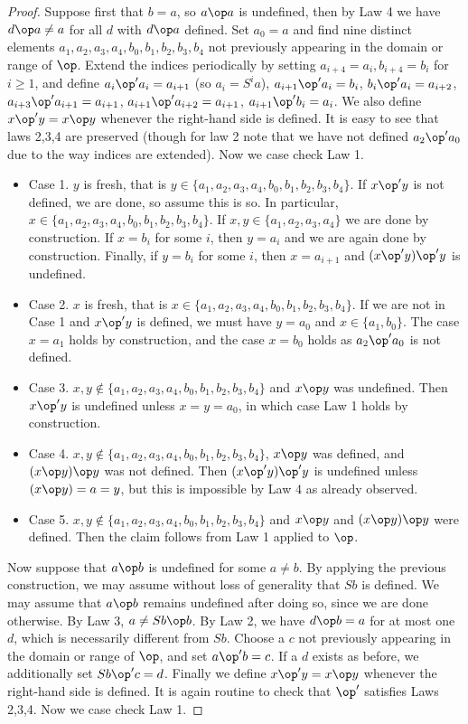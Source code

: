 \begin{proof}  Suppose first that $b=a$, so $a \op a$ is undefined, then by Law 4 we have $d \op a \neq a$ for all $d$ with $d \op a$ defined. Set $a_0=a$ and find nine distinct elements $a_1,a_2,a_3,a_4,b_0,b_1,b_2,b_3,b_4$ not previously appearing in the domain or range of $\op$. Extend the indices periodically by setting $a_{i+4} = a_i,b_{i+4} = b_i$ for $i \ge 1$, and define $a_i \op' a_i = a_{i+1}$ (so $a_i = S^i a$), $a_{i+1} \op' a_i = b_i$, $b_i \op' a_i = a_{i+2}$, $a_{i+3} \op' a_{i+1} = a_{i+1}$, $a_{i+1} \op' a_{i+2} = a_{i+1}$, $a_{i+1} \op' b_i = a_i$.  We also define $x \op' y = x \op y$ whenever the right-hand side is defined. It is easy to see that laws 2,3,4 are preserved (though for law 2 note that we have not defined $a_2 \op' a_0$ due to the way indices are extended). Now we case check Law 1.  \begin{itemize}
    \item Case 1. $y$ is fresh, that is $y \in \{a_1,a_2,a_3,a_4,b_0,b_1,b_2,b_3,b_4\}$. If $x \op' y$ is not defined, we are done, so assume this is so. In particular, $x  \in \{a_1,a_2,a_3,a_4,b_0,b_1,b_2,b_3,b_4\}$. If $x,y \in \{a_1,a_2,a_3,a_4\}$ we are done by construction. If $x = b_i$ for some $i$, then $y = a_i$ and we are again done by construction. Finally, if $y = b_i$ for some $i$, then $x = a_{i+1}$ and $(x \op' y) \op' y$ is undefined.
    \item Case 2. $x$ is fresh, that is $x \in \{a_1,a_2,a_3,a_4,b_0,b_1,b_2,b_3,b_4\}$. If we are not in Case 1 and $x \op' y$ is defined, we must have $y = a_0$ and $x \in \{a_1, b_0\}$. The case $x = a_1$ holds by construction, and the case $x = b_0$ holds as $a_2 \op' a_0$ is not defined.
    \item Case 3. $x,y \not \in  \{a_1,a_2,a_3,a_4,b_0,b_1,b_2,b_3,b_4\}$ and $x \op y$ was undefined. Then $x \op' y$ is undefined unless $x=y=a_0$, in which case Law 1 holds by construction.
    \item Case 4. $x,y \not \in  \{a_1,a_2,a_3,a_4,b_0,b_1,b_2,b_3,b_4\}$, $x \op y$ was defined, and $(x \op y) \op y$ was not defined. Then $(x \op' y) \op' y$ is undefined unless $(x \op y) = a = y$, but this is impossible by Law $4$ as already observed.
    \item Case 5. $x,y \not \in  \{a_1,a_2,a_3,a_4,b_0,b_1,b_2,b_3,b_4\}$ and $x \op y$ and $(x \op y) \op y$ were defined. Then the claim follows from Law 1 applied to $\op$.
\end{itemize}

Now suppose that $a \op b$ is undefined for some $a \neq b$.  By applying the previous construction, we may assume without loss of generality that $Sb$ is defined.  We may assume that $a \op b$ remains undefined after doing so, since we are done otherwise.  By Law 3, $a \neq Sb \op b$.  By Law 2, we have $d \op b = a$ for at most one $d$, which is necessarily different from $Sb$.  Choose a $c$ not previously appearing in the domain or range of $\op$, and set $a \op' b = c$.  If a $d$ exists as before, we additionally set $Sb \op' c = d$.  Finally we define $x \op' y = x \op y$ whenever the right-hand side is defined.
It is again routine to check that $\op'$ satisfies Laws 2,3,4.  Now we case check Law 1.


\end{proof}
